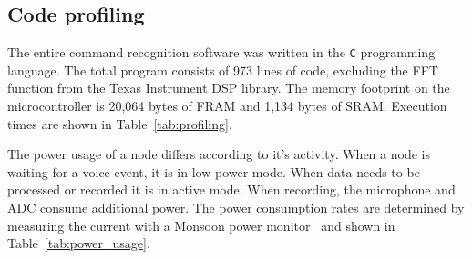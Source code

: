 \subsection{Code profiling}
The entire command recognition software was written in the {\tt C} programming language. The total program consists of 973 lines of code, excluding the FFT function from the Texas Instrument DSP library.
%
The memory footprint on the microcontroller is 20,064 bytes of FRAM and 1,134 bytes of SRAM. Execution times are shown in Table~\ref{tab:profiling}.

The power usage of a node differs according to it's activity. When a node is waiting for a voice event, it is in low-power mode. When data needs to be processed or recorded it is in active mode. When recording, the microphone and ADC consume additional power. The power consumption rates are determined by measuring the current with a Monsoon power monitor~\cite{monsoon} and shown in Table~\ref{tab:power_usage}.



